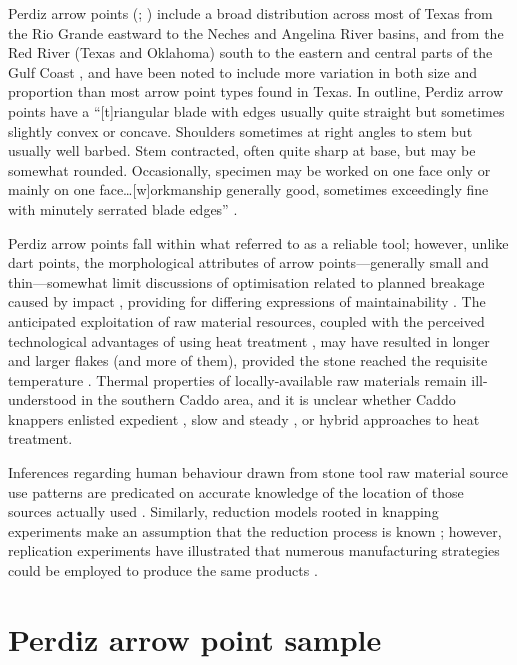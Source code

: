 \documentclass[review]{elsarticle}
\begin{document}
Perdiz arrow points (\citealp[283 and Plate 142]{RN7795}; \citealp[504 and Plate 131]{RN5769}) include a broad distribution across most of Texas from the Rio Grande eastward to the Neches and Angelina River basins, and from the Red River (Texas and Oklahoma) south to the eastern and central parts of the Gulf Coast \citep[Figure 40]{RN9010}, and have been noted to include more variation in both size and proportion than most arrow point types found in Texas. In outline, Perdiz arrow points have a “[t]riangular blade with edges usually quite straight but sometimes slightly convex or concave. Shoulders sometimes at right angles to stem but usually well barbed. Stem contracted, often quite sharp at base, but may be somewhat rounded. Occasionally, specimen may be worked on one face only or mainly on one face…[w]orkmanship generally good, sometimes exceedingly fine with minutely serrated blade edges” \cite[504]{RN5769}. 

Perdiz arrow points fall within what \citet[738-741]{RN5873} referred to as a reliable tool; however, unlike dart points, the morphological attributes of arrow points---generally small and thin---somewhat limit discussions of optimisation related to planned breakage caused by impact \citep{RN6170,RN7045}, providing for differing expressions of maintainability \citep{RN5789}. The anticipated exploitation of raw material resources, coupled with the perceived technological advantages of using heat treatment \citep{RN6171}, may have resulted in longer and larger flakes (and more of them), provided the stone reached the requisite temperature \citep{RN5900}. Thermal properties of locally-available raw materials remain ill-understood in the southern Caddo area, and it is unclear whether Caddo knappers enlisted expedient \citep{RN8970,RN6201}, slow and steady \citep{RN8971}, or hybrid approaches to heat treatment.

Inferences regarding human behaviour drawn from stone tool raw material source use patterns are predicated on accurate knowledge of the location of those sources actually used \citep[365]{RN5787}. Similarly, reduction models rooted in knapping experiments make an assumption that the reduction process is known \citep{RN6855}; however, replication experiments have illustrated that numerous manufacturing strategies could be employed to produce the same products \citep{RN8968,RN8969}. 

\section*{Perdiz arrow point sample}
\end{document}
